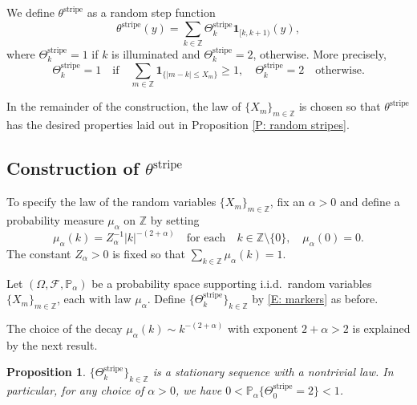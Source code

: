 \documentclass[12pt]{amsart}
\newtheorem{prop}{Proposition}
\begin{document}
We define $\theta^{\text{stripe}}$ as a random step function
	\begin{equation} \label{E: random step correlations}
		\theta^{\text{stripe}}(y) = \sum_{k \in \mathbb{Z}} \Theta^{\text{stripe}}_{k} \mathbf{1}_{[k,k+1)}(y),
	\end{equation}
where $\Theta^{\text{stripe}}_{k} = 1$ if $k$ is illuminated and $\Theta^{\text{stripe}}_{k} = 2$, otherwise.  More precisely,
	\begin{equation} \label{E: markers}
		\Theta^{\text{stripe}}_{k} = 1 \quad \text{if} \quad \sum_{m \in \mathbb{Z}} \mathbf{1}_{\{|m - k| \leq X_{m}\}} \geq 1 , \quad \Theta^{\text{stripe}}_{k} = 2 \quad \text{otherwise.}	
	\end{equation}

In the remainder of the construction, the law of $\{X_{m}\}_{m \in \mathbb{Z}}$ is chosen so that $\theta^{\text{stripe}}$ has the desired properties laid out in Proposition \ref{P: random stripes}.
	
\subsection{Construction of $\theta^{\text{stripe}}$} \label{S: algebraic correlation construction} To specify the law of the random variables $\{X_{m}\}_{m \in \mathbb{Z}}$, fix an $\alpha > 0$ and define a probability measure $\mu_{\alpha}$ on $\mathbb{Z}$ by setting
	\begin{equation*}
		\mu_{\alpha}(k) = Z_{\alpha}^{-1} |k|^{-(2 + \alpha)} \quad \text{for each} \quad k \in \mathbb{Z} \setminus \{0\}, \quad \mu_{\alpha}(0) = 0.
	\end{equation*}
The constant $Z_{\alpha} > 0$ is fixed so that $\sum_{k \in \mathbb{Z}} \mu_{\alpha}(k) = 1$.

Let $(\Omega,\mathcal{F},\mathbb{P}_{\alpha})$ be a probability space supporting i.i.d.\ random variables $\{X_{m}\}_{m \in \mathbb{Z}}$, each with law $\mu_{\alpha}$.  Define $\{\Theta^{\text{stripe}}_{k}\}_{k \in \mathbb{Z}}$ by \eqref{E: markers} as before.  

	The choice of the decay $\mu_{ \alpha } (k) \sim k^{-(2 + \alpha)}$ with exponent $2 + \alpha > 2$ is explained by the next result.

	\begin{prop} $\{\Theta^{\text{stripe}}_{k}\}_{k \in \mathbb{Z}}$ is a stationary sequence with a nontrivial law.  In particular, for any choice of $\alpha > 0$, we have $0 < \mathbb{P}_{\alpha} \{\Theta^{\text{stripe}}_{0} = 2\} < 1$. \end{prop}
	
\end{document}
